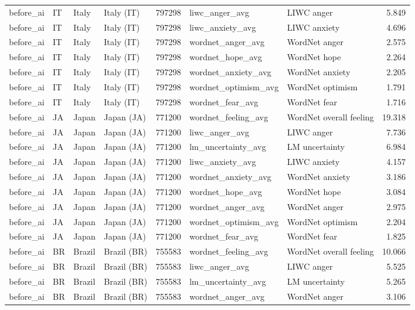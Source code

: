 \begin{tabular}{llllrllr}
before\_ai & IT & Italy & Italy (IT) & 797298 & liwc\_anger\_avg & LIWC anger & 5.849 \\
before\_ai & IT & Italy & Italy (IT) & 797298 & liwc\_anxiety\_avg & LIWC anxiety & 4.696 \\
before\_ai & IT & Italy & Italy (IT) & 797298 & wordnet\_anger\_avg & WordNet anger & 2.575 \\
before\_ai & IT & Italy & Italy (IT) & 797298 & wordnet\_hope\_avg & WordNet hope & 2.264 \\
before\_ai & IT & Italy & Italy (IT) & 797298 & wordnet\_anxiety\_avg & WordNet anxiety & 2.205 \\
before\_ai & IT & Italy & Italy (IT) & 797298 & wordnet\_optimism\_avg & WordNet optimism & 1.791 \\
before\_ai & IT & Italy & Italy (IT) & 797298 & wordnet\_fear\_avg & WordNet fear & 1.716 \\
before\_ai & JA & Japan & Japan (JA) & 771200 & wordnet\_feeling\_avg & WordNet overall feeling & 19.318 \\
before\_ai & JA & Japan & Japan (JA) & 771200 & liwc\_anger\_avg & LIWC anger & 7.736 \\
before\_ai & JA & Japan & Japan (JA) & 771200 & lm\_uncertainty\_avg & LM uncertainty & 6.984 \\
before\_ai & JA & Japan & Japan (JA) & 771200 & liwc\_anxiety\_avg & LIWC anxiety & 4.157 \\
before\_ai & JA & Japan & Japan (JA) & 771200 & wordnet\_anxiety\_avg & WordNet anxiety & 3.186 \\
before\_ai & JA & Japan & Japan (JA) & 771200 & wordnet\_hope\_avg & WordNet hope & 3.084 \\
before\_ai & JA & Japan & Japan (JA) & 771200 & wordnet\_anger\_avg & WordNet anger & 2.975 \\
before\_ai & JA & Japan & Japan (JA) & 771200 & wordnet\_optimism\_avg & WordNet optimism & 2.204 \\
before\_ai & JA & Japan & Japan (JA) & 771200 & wordnet\_fear\_avg & WordNet fear & 1.825 \\
before\_ai & BR & Brazil & Brazil (BR) & 755583 & wordnet\_feeling\_avg & WordNet overall feeling & 10.066 \\
before\_ai & BR & Brazil & Brazil (BR) & 755583 & liwc\_anger\_avg & LIWC anger & 5.525 \\
before\_ai & BR & Brazil & Brazil (BR) & 755583 & lm\_uncertainty\_avg & LM uncertainty & 5.265 \\
before\_ai & BR & Brazil & Brazil (BR) & 755583 & wordnet\_anger\_avg & WordNet anger & 3.106 \\

\end{tabular}
